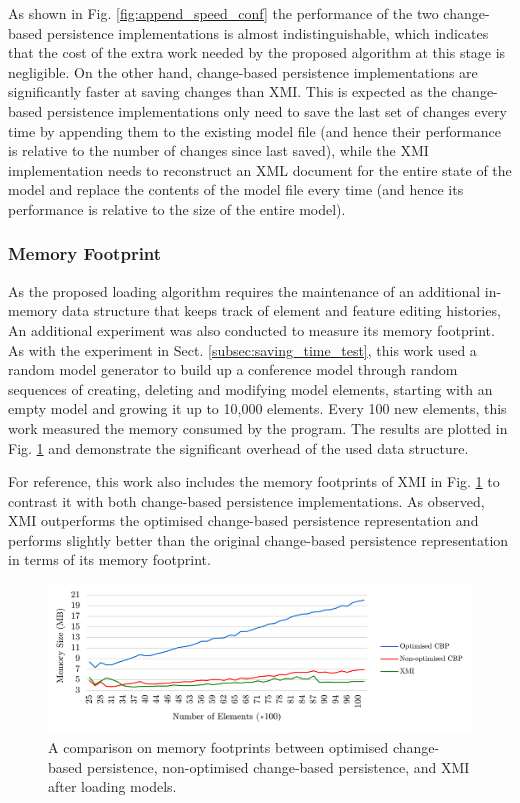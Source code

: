 \documentclass[12pt, a4paper]{report} \usepackage[titletoc]{appendix}
\begin{document}
As shown in Fig. \ref{fig:append_speed_conf} the performance of the two change-based persistence implementations is almost indistinguishable, which indicates that the cost of the extra work needed by the proposed algorithm at this stage is negligible. On the other hand, change-based persistence implementations are significantly faster at saving changes than XMI. This is expected as the change-based persistence implementations only need to save the last set of changes every time by appending them to the existing model file (and hence their performance is relative to the number of changes since last saved), while the XMI implementation needs to reconstruct an XML document for the entire state of the model and replace the contents of the model file every time (and hence its performance is relative to the size of the entire model). 

\subsubsection{Memory Footprint}
\label{subsec:memory_consumption}
As the proposed loading algorithm requires the maintenance of an additional in-memory data structure that keeps track of element and feature editing histories, An additional experiment was also conducted to measure its memory footprint. As with the experiment in Sect. \ref{subsec:saving_time_test}, this work used a random model generator to build up a conference model through random sequences of creating, deleting and modifying model elements, starting with an empty model and growing it up to 10,000 elements. Every 100 new elements, this work measured the memory consumed by the program. The results are plotted in Fig. \ref{fig:memory_ochange-based persistence_change-based persistence_xmi} and demonstrate the significant overhead of the used data structure.

For reference, this work also includes the memory footprints of XMI in Fig. \ref{fig:memory_ochange-based persistence_change-based persistence_xmi} to contrast it with both change-based persistence implementations. As observed, XMI outperforms the optimised change-based persistence representation and performs slightly better than the original change-based persistence representation in terms of its memory footprint. 

\begin{figure}[H]	
	\centering
	\includegraphics[width=\linewidth]{memory_ocbp_cbp_xmi}
	\caption{A comparison on memory footprints between optimised change-based persistence, non-optimised change-based persistence, and XMI after loading models.}\label{fig:memory_ochange-based persistence_change-based persistence_xmi}
\end{figure}
\end{document}
